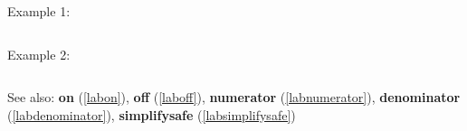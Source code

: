\noindent Example 1: 
\begin{center}\begin{minipage}{15cm}\begin{Verbatim}[frame=single]
\end{Verbatim}
\end{minipage}\end{center}
\noindent Example 2: 
\begin{center}\begin{minipage}{15cm}\begin{Verbatim}[frame=single]
\end{Verbatim}
\end{minipage}\end{center}
See also: \textbf{on} (\ref{labon}), \textbf{off} (\ref{laboff}), \textbf{numerator} (\ref{labnumerator}), \textbf{denominator} (\ref{labdenominator}), \textbf{simplifysafe} (\ref{labsimplifysafe})
